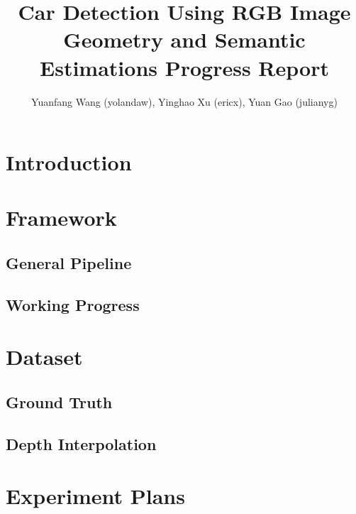 \documentclass[a4paper]{article}
\title{Car Detection Using RGB Image Geometry and Semantic Estimations Progress Report}
\author{Yuanfang Wang (yolandaw), Yinghao Xu (ericx), Yuan Gao (julianyg)}
\begin{document}
\maketitle
\section{Introduction}

\section{Framework}
\subsection{General Pipeline}

\subsection{Working Progress}
\section{Dataset}

\subsection{Ground Truth}
\subsection{Depth Interpolation}

\section{Experiment Plans}
\end{document}
